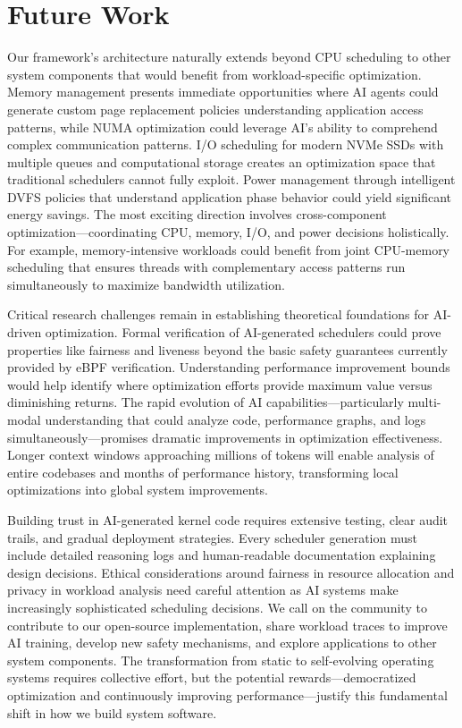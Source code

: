 \section{Future Work}

Our framework's architecture naturally extends beyond CPU scheduling to other system components that would benefit from workload-specific optimization. Memory management presents immediate opportunities where AI agents could generate custom page replacement policies understanding application access patterns, while NUMA optimization could leverage AI's ability to comprehend complex communication patterns. I/O scheduling for modern NVMe SSDs with multiple queues and computational storage creates an optimization space that traditional schedulers cannot fully exploit. Power management through intelligent DVFS policies that understand application phase behavior could yield significant energy savings. The most exciting direction involves cross-component optimization—coordinating CPU, memory, I/O, and power decisions holistically. For example, memory-intensive workloads could benefit from joint CPU-memory scheduling that ensures threads with complementary access patterns run simultaneously to maximize bandwidth utilization.

Critical research challenges remain in establishing theoretical foundations for AI-driven optimization. Formal verification of AI-generated schedulers could prove properties like fairness and liveness beyond the basic safety guarantees currently provided by eBPF verification. Understanding performance improvement bounds would help identify where optimization efforts provide maximum value versus diminishing returns. The rapid evolution of AI capabilities—particularly multi-modal understanding that could analyze code, performance graphs, and logs simultaneously—promises dramatic improvements in optimization effectiveness. Longer context windows approaching millions of tokens will enable analysis of entire codebases and months of performance history, transforming local optimizations into global system improvements.

Building trust in AI-generated kernel code requires extensive testing, clear audit trails, and gradual deployment strategies. Every scheduler generation must include detailed reasoning logs and human-readable documentation explaining design decisions. Ethical considerations around fairness in resource allocation and privacy in workload analysis need careful attention as AI systems make increasingly sophisticated scheduling decisions. We call on the community to contribute to our open-source implementation, share workload traces to improve AI training, develop new safety mechanisms, and explore applications to other system components. The transformation from static to self-evolving operating systems requires collective effort, but the potential rewards—democratized optimization and continuously improving performance—justify this fundamental shift in how we build system software.